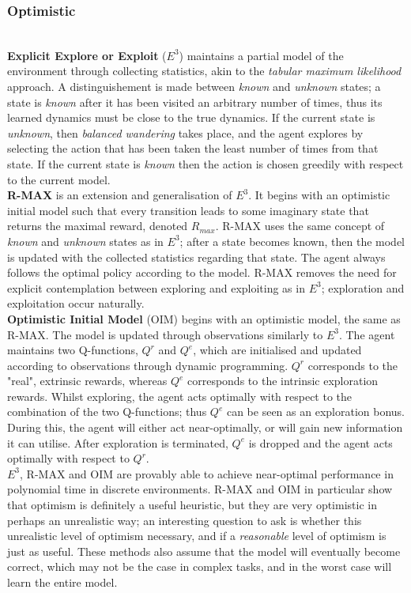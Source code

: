 \subsubsection{Optimistic}
\\\textbf{Explicit Explore or Exploit} ($E^3$) \cite{Kearns+Singh:2002} maintains a partial model of the environment through collecting statistics, akin to the \textit{tabular maximum likelihood} approach. A distinguishement is made between \textit{known} and \textit{unknown} states; a state is \textit{known} after it has been visited an arbitrary number of times, thus its learned dynamics must be close to the true dynamics. If the current state is \textit{unknown}, then \textit{balanced wandering} takes place, and the agent explores by selecting the action that has been taken the least number of times from that state. If the current state is \textit{known} then the action is chosen greedily with respect to the current model.
\\\textbf{R-MAX} \cite{10.1162/153244303765208377} is an extension and generalisation of $E^3$. It begins with an optimistic initial model such that every transition leads to some imaginary state that returns the maximal reward, denoted $R_{max}$. R-MAX uses the same concept of \textit{known} and \textit{unknown} states as in $E^3$; after a state becomes known, then the model is updated with the collected statistics regarding that state. The agent always follows the optimal policy according to the model. R-MAX removes the need for explicit contemplation between exploring and exploiting as in $E^3$; exploration and exploitation occur naturally.
\\\textbf{Optimistic Initial Model} (OIM) \cite{10.1145/1390156.1390288} begins with an optimistic model, the same as R-MAX. The model is updated through observations similarly to $E^3$. The agent maintains two Q-functions, $Q^r$ and $Q^e$, which are initialised and updated according to observations through dynamic programming. $Q^r$ corresponds to the "real", extrinsic rewards, whereas $Q^e$ corresponds to the intrinsic exploration rewards. Whilst exploring, the agent acts optimally with respect to the combination of the two Q-functions; thus $Q^e$ can be seen as an exploration bonus. During this, the agent will either act near-optimally, or will gain new information it can utilise. After exploration is terminated, $Q^e$ is dropped and the agent acts optimally with respect to $Q^r$.
\\ $E^3$, R-MAX and OIM are provably able to achieve near-optimal performance in polynomial time in discrete environments. R-MAX and OIM in particular show that optimism is definitely a useful heuristic, but they are very optimistic in perhaps an unrealistic way; an interesting question to ask is whether this unrealistic level of optimism necessary, and if a \textit{reasonable} level of optimism is just as useful. These methods also assume that the model will eventually become correct, which may not be the case in complex tasks, and in the worst case will learn the entire model.
